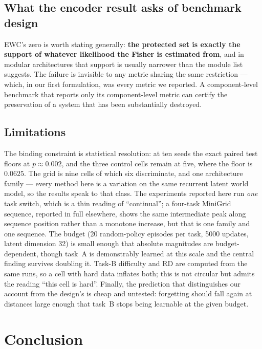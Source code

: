 \documentclass[11pt]{article}
\begin{document}
\subsection{What the encoder result asks of benchmark design}

EWC's zero is worth stating generally: \textbf{the protected set is exactly the
support of whatever likelihood the Fisher is estimated from}, and in modular
architectures that support is usually narrower than the module list suggests.
The failure is invisible to any metric sharing the same restriction --- which,
in our first formulation, was every metric we reported. A component-level
benchmark that reports only its component-level metric can certify the
preservation of a system that has been substantially destroyed.

\subsection{Limitations}
\label{sec:discussion:limitations}

The binding constraint is statistical resolution: at ten seeds the exact paired
test floors at $p \approx 0.002$, and the three control cells remain at five,
where the floor is $0.0625$. The grid is nine cells of which six discriminate,
and one architecture family --- every method here is a variation on the same
recurrent latent world model, so the results speak to that class. The
experiments reported here run \emph{one} task switch, which is a thin reading of
``continual''; a four-task MiniGrid sequence, reported in full elsewhere, shows
the same intermediate peak along sequence position rather than a monotone
increase, but that is one family and one sequence. The budget
(20 random-policy episodes per task, 5000 updates, latent dimension 32) is
small enough that absolute magnitudes are budget-dependent, though task~A is
demonstrably learned at this scale and the central finding survives doubling
it. Task-B difficulty and RD are computed from the same runs, so a cell with
hard data inflates both; this is not circular but admits the reading ``this
cell is hard''. Finally, the prediction that distinguishes our account from the
design's is cheap and untested: forgetting should fall again at distances large
enough that task~B stops being learnable at the given budget.

\section{Conclusion}
\label{sec:conclusion}
\end{document}
